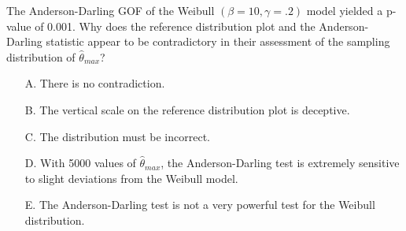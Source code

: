 \documentclass[10pt]{report}
\def\be{\begin{enumerate}}
\def\ee{\end{enumerate}}
\def\vn{\vskip0mm}
\def\vnn{\vskip2mm\noindent}
\begin{document}
\begin{enumerate}
\vn
The Anderson-Darling GOF of the Weibull $(\beta=10,\gamma=.2)$ model yielded a p-value of 0.001.
Why does the reference distribution plot and the Anderson-Darling statistic appear to be contradictory in their assessment of
the sampling distribution of $\hat\theta_{max}$?
\be
\item[A.] There is no contradiction.
\item[B.] The vertical scale on the reference distribution plot is deceptive.
\item[C.] The distribution must be incorrect.
\item[D.] With 5000 values of $\hat\theta_{max}$, the Anderson-Darling test is extremely sensitive to slight deviations
from the Weibull model.
\item[E.] The Anderson-Darling test is not a very powerful test for the Weibull distribution.
\ee
\ee
\vnn\vnn
\vfill
\end{document}
